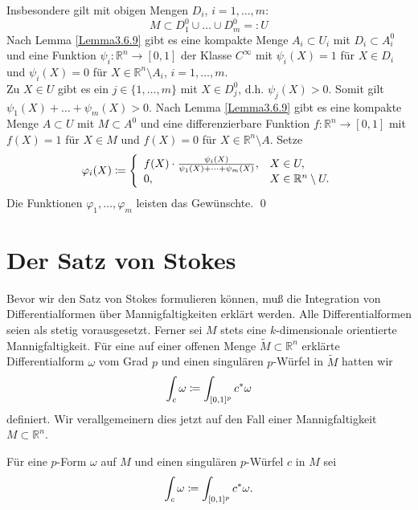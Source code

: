 \documentclass[a4paper,twoside,DIV15,BCOR12mm]{scrbook}
\begin{document}
\noindent
Insbesondere gilt mit obigen Mengen $D_{i}$, $i = 1,\dots,m$:
\[ M \subset D_{1}^{0} \cup \dots \cup D_{m}^{0} =: U \]
Nach Lemma \ref{Lemma3.6.9} gibt es eine kompakte Menge $A_{i} \subset U_{i}$ 
mit $D_{i} \subset A_{i}^{0}$ und eine Funktion $\psi_{i}: {\mathbb 
R}^{n} \to [0,1]$ der Klasse $C^{\infty}$ mit $\psi_{i}(X) = 1$ für 
$X \in D_{i}$ und $\psi_{i}(X) = 0$ für $X \in {\mathbb R}^{n} 
\setminus A_{i}$, $i = 1,\dots,m$.\\

\noindent
Zu $X \in U$ gibt es ein $j \in \{1,\dots,m\}$ mit $X \in D_{j}^{0}$, 
d.h. $\psi_{j}(X) > 0$. Somit gilt $\psi_{1}(X) + \dots + 
\psi_{m}(X) > 0$. Nach Lemma \ref{Lemma3.6.9} gibt es eine kompakte Menge $A 
\subset U$ mit $M \subset A^{0}$ und eine differenzierbare Funktion 
$f: {\mathbb R}^{n} \to [0,1]$ mit $f(X) = 1$ für $X \in M$ und 
$f(X) = 0$ für $X \in {\mathbb R}^{n} \setminus A$. Setze
\[ \varphi_{i}(X) \da  \left\{ \begin{array}{ll}
f(X) \cdot \frac{\psi_{i}(X)}{\psi_{1}(X) + \dots + \psi_{m}(X)}, & X 
\in U, \\ 0, & X \in {\mathbb R}^{n} \setminus U. \end{array} 
\right. \]
Die Funktionen $\varphi_{1},\dots,\varphi_{m}$ leisten das 
Gewünschte. \qed\\




\section{Der Satz von Stokes}
Bevor wir den Satz von Stokes formulieren können, muß die 
 Integration von Differentialformen über Mannigfaltigkeiten erklärt 
 werden. Alle Differentialformen seien als stetig vorausgesetzt. 
 Ferner sei $M$ stets eine $k$-dimensionale orientierte Mannigfaltigkeit. 
 Für eine auf einer offenen Menge $\tilde{M} \subset {\mathbb R}^{n}$ erklärte 
 Differentialform $\omega$ vom Grad $p$ und einen singulären 
 $p$-Würfel in $\tilde{M}$ hatten wir 
\[ \int_{c} \omega \da  \int_{[0,1]^{p}} c^{*} \omega \]
definiert. Wir verallgemeinern dies jetzt auf den Fall einer Mannigfaltigkeit 
$M \subset {\mathbb R}^{n}$.

\bigskip

 Für eine $p$-Form $\omega$ auf $M$ und einen 
singulären $p$-Würfel $c$ in $M$ sei
\[ \int_{c} \omega \da  \int_{[0,1]^{p}} c^{*} \omega. \]

\bigskip
\end{document}
